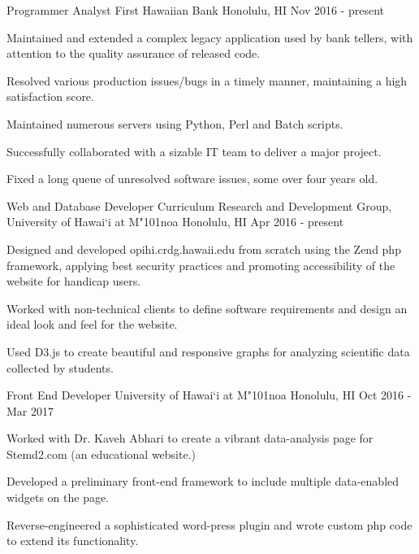 \begin{cventries}
   	\cventry
    {Programmer Analyst}
    {First Hawaiian Bank}
    {Honolulu, HI}
    {Nov 2016 - present}
    {
        \begin{cvitems}
            \item {Maintained and extended a complex legacy application used by bank tellers, with attention to the quality assurance of released code.}
            \item {Resolved various production issues/bugs in a timely manner, maintaining a high satisfaction score.}
            \item {Maintained numerous servers using Python, Perl and Batch scripts.}
            \item {Successfully collaborated with a sizable IT team to deliver a major project.}
            \item {Fixed a long queue of unresolved software issues, some over four years old.}
        \end{cvitems}
    }

	\cventry
	{Web and Database Developer}
	{Curriculum Research and Development Group, University of Hawai`i at M{\char"101}noa}
	{Honolulu, HI}
	{Apr 2016 - present}
	{
		\begin{cvitems}
			\item {Designed and developed opihi.crdg.hawaii.edu from scratch using the Zend php framework, applying best security practices and promoting accessibility of the website for handicap users.}
			\item {Worked with non-technical clients to define software requirements and design an ideal look and feel for the website.}
			\item {Used D3.js to create beautiful and responsive graphs for analyzing scientific data collected by students.}
		\end{cvitems}
	}


	\cventry
	{Front End Developer}
	{University of Hawai`i at M{\char"101}noa}
	{Honolulu, HI}
	{Oct 2016 - Mar 2017}
	{
		\begin{cvitems}
			\item {Worked with Dr. Kaveh Abhari to create a vibrant data-analysis page for Stemd2.com (an educational website.)}
			\item {Developed a preliminary front-end framework to include multiple data-enabled widgets on the page.}
			\item {Reverse-engineered a sophisticated word-press plugin and wrote custom php code to extend its functionality.}
		\end{cvitems}
	}


\end{cventries}
